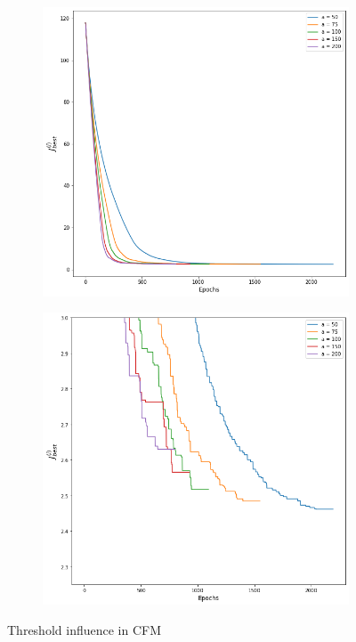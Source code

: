 \begin{figure}[htbp]
    \begin{subfigure}{.5\textwidth}
        \centering
        \includegraphics[width=.9\textwidth]{images/threshold_convergence_speed.png}
        \label{fig:speed_acc}
    \end{subfigure}%
    \begin{subfigure}{.5\textwidth}
        \centering
        \includegraphics[width=.9\textwidth]{images/threshold_convergence_speed_zoom.png}
        \label{fig:speed_acc_zoom}
    \end{subfigure}
    \caption{Threshold influence in CFM}
    \label{fig:threshold}
\end{figure}

